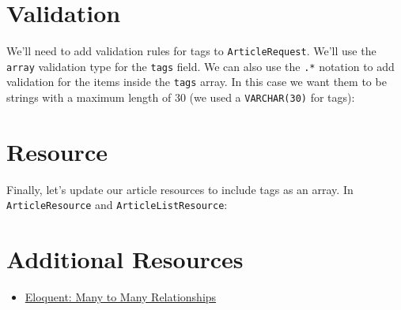 \section{Validation}

We'll need to add validation rules for tags to \texttt{ArticleRequest}. We'll use the \texttt{array} validation type for the \texttt{tags} field. We can also use the \texttt{.*} notation to add validation for the items inside the \texttt{tags} array. In this case we want them to be strings with a maximum length of 30 (we used a \texttt{VARCHAR(30)} for tags):



\section{Resource}

Finally, let's update our article resources to include tags as an array. In \texttt{ArticleResource} and \texttt{ArticleListResource}:




\section{Additional Resources}

\begin{itemize}[leftmargin=*]
    \item \href{http://laravel.com/docs/master/eloquent-relationships#many-to-many}{Eloquent: Many to Many Relationships}
\end{itemize}
